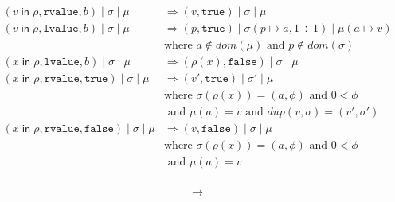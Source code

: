 \documentclass{article}
\newcommand{\IN}{\mathop{\mathsf{in}}}
\begin{document}
\begin{align*}
  (v \IN \rho,\mathtt{rvalue},b) \mid \sigma \mid \mu  &
     \Rightarrow (v, \mathtt{true}) \mid \sigma \mid \mu \\
  (v \IN \rho,\mathtt{lvalue},b) \mid \sigma \mid \mu &
     \Rightarrow (p, \mathtt{true}) \mid \sigma(p \mapsto a,1 \div 1) \mid \mu(a \mapsto v) \\
     & \text{where } a \notin \mathit{dom}(\mu)
     \text{ and } p \notin \mathit{dom}(\sigma)             \\[2ex]
 (x \IN \rho,\mathtt{lvalue}, b) \mid \sigma \mid \mu &
      \Rightarrow (\rho(x), \mathtt{false}) \mid \sigma \mid \mu \\
  (x \IN \rho,\mathtt{rvalue}, \mathtt{true}) \mid \sigma \mid \mu  &
     \Rightarrow (v', \mathtt{true}) \mid \sigma' \mid \mu\\
     & \text{where } \sigma(\rho(x)) = (a, \phi) 
       \text{ and } 0 < \phi \\
     & \text{ and } \mu(a) = v
       \text{ and } \mathit{dup}(v,\sigma) = (v',\sigma') \\
 (x \IN \rho,\mathtt{rvalue}, \mathtt{false}) \mid \sigma \mid \mu &
      \Rightarrow (v, \mathtt{false}) \mid \sigma \mid \mu\\
     & \text{where } \sigma(\rho(x)) = (a, \phi) 
       \text{ and } 0 < \phi \\
     & \text{ and } \mu(a) = v\\[2ex]
\end{align*}


\begin{align*}
  \longrightarrow
\end{align*}
\end{document}
